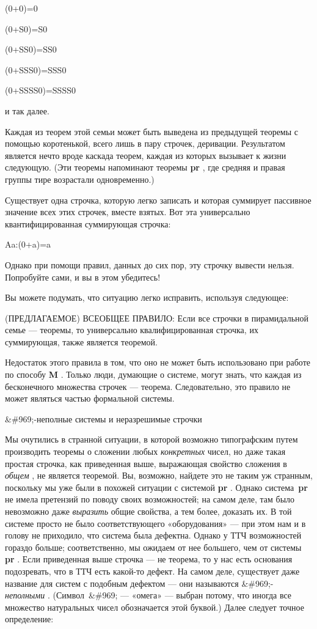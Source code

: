 \documentclass[../main.tex]{subfiles}
\begin{document}
(0+0)=0

(0+S0)=S0

(0+SS0)=SS0

(0+SSS0)=SSS0

(0+SSSS0)=SSSS0

и так далее.

Каждая из теорем этой семьи может быть выведена из предыдущей теоремы с помощью коротенькой, всего лишь в пару строчек, деривации. Результатом является нечто вроде каскада теорем, каждая из которых вызывает к жизни следующую. (Эти теоремы напоминают теоремы \textbf{pr} , где средняя и правая группы тире возрастали одновременно.)

Существует одна строчка, которую легко записать и которая суммирует пассивное значение всех этих строчек, вместе взятых. Вот эта универсально квантифицированная суммирующая строчка:

Aa:(0+a)=a

Однако при помощи правил, данных до сих пор, эту строчку вывести нельзя. Попробуйте сами, и вы в этом убедитесь!

Вы можете подумать, что ситуацию легко исправить, используя следующее:

(ПРЕДЛАГАЕМОЕ) ВСЕОБЩЕЕ ПРАВИЛО: Если все строчки в пирамидальной семье --- теоремы, то универсально квалифицированная строчка, их суммирующая, также является теоремой.

Недостаток этого правила в том, что оно не может быть использовано при работе по способу \textbf{M} . Только люди, думающие о системе, могут знать, что каждая из бесконечного множества строчек --- теорема. Следовательно, это правило не может являться частью формальной системы.

\&\#969;-неполные системы и неразрешимые строчки

Мы очутились в странной ситуации, в которой возможно типографским путем производить теоремы о сложении любых \emph{конкретных} чисел, но даже такая простая строчка, как приведенная выше, выражающая свойство сложения в \emph{общем} , не является теоремой. Вы, возможно, найдете это не таким уж странным, поскольку мы уже были в похожей ситуации с системой \textbf{pr} . Однако система~\textbf{pr} не имела претензий по поводу своих возможностей; на самом деле, там было невозможно даже \emph{выразить} общие свойства, а тем более, доказать их. В той системе просто не было соответствующего «оборудования» --- при этом нам и в голову не приходило, что система была дефектна. Однако у ТТЧ возможностей гораздо больше; соответственно, мы ожидаем от нее большего, чем от системы \textbf{pr} . Если приведенная выше строчка --- не теорема, то у нас есть основания подозревать, что в ТТЧ есть какой-то дефект. На самом деле, существует даже название для систем с подобным дефектом --- они называются \&\#969;-\emph{неполными} . (Символ~\&\#969; --- «омега» --- выбран потому, что иногда все множество натуральных чисел обозначается этой буквой.) Далее следует точное определение:
\end{document}
